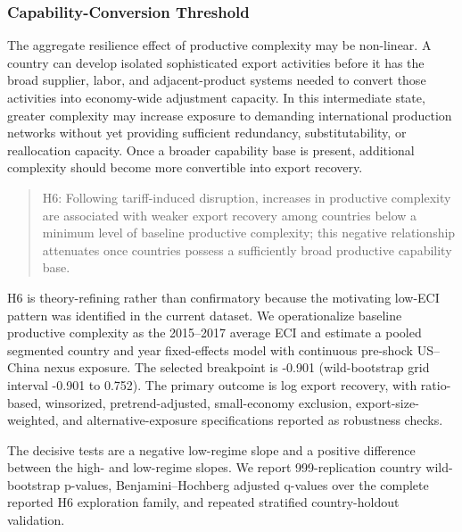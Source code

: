 \subsubsection{Capability-Conversion Threshold}

The aggregate resilience effect of productive complexity may be non-linear. A country can develop isolated sophisticated export activities before it has the broad supplier, labor, and adjacent-product systems needed to convert those activities into economy-wide adjustment capacity. In this intermediate state, greater complexity may increase exposure to demanding international production networks without yet providing sufficient redundancy, substitutability, or reallocation capacity. Once a broader capability base is present, additional complexity should become more convertible into export recovery.

\begin{quote}
H6: Following tariff-induced disruption, increases in productive complexity are associated with weaker export recovery among countries below a minimum level of baseline productive complexity; this negative relationship attenuates once countries possess a sufficiently broad productive capability base.
\end{quote}

H6 is theory-refining rather than confirmatory because the motivating low-ECI pattern was identified in the current dataset. We operationalize baseline productive complexity as the 2015--2017 average ECI and estimate a pooled segmented country and year fixed-effects model with continuous pre-shock US--China nexus exposure. The selected breakpoint is -0.901 (wild-bootstrap grid interval -0.901 to 0.752). The primary outcome is log export recovery, with ratio-based, winsorized, pretrend-adjusted, small-economy exclusion, export-size-weighted, and alternative-exposure specifications reported as robustness checks.

The decisive tests are a negative low-regime slope and a positive difference between the high- and low-regime slopes. We report 999-replication country wild-bootstrap p-values, Benjamini--Hochberg adjusted q-values over the complete reported H6 exploration family, and repeated stratified country-holdout validation.